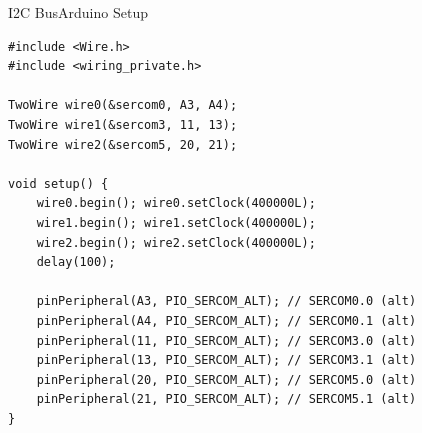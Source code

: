 \begin{frame}
\end{frame}

\begin{frame}[fragile]{I2C Bus}{Arduino Setup}
    \begin{verbatim}
#include <Wire.h>
#include <wiring_private.h>

TwoWire wire0(&sercom0, A3, A4);
TwoWire wire1(&sercom3, 11, 13);
TwoWire wire2(&sercom5, 20, 21);

void setup() {
    wire0.begin(); wire0.setClock(400000L);
    wire1.begin(); wire1.setClock(400000L);
    wire2.begin(); wire2.setClock(400000L);
    delay(100);

    pinPeripheral(A3, PIO_SERCOM_ALT); // SERCOM0.0 (alt)
    pinPeripheral(A4, PIO_SERCOM_ALT); // SERCOM0.1 (alt)
    pinPeripheral(11, PIO_SERCOM_ALT); // SERCOM3.0 (alt)
    pinPeripheral(13, PIO_SERCOM_ALT); // SERCOM3.1 (alt)
    pinPeripheral(20, PIO_SERCOM_ALT); // SERCOM5.0 (alt)
    pinPeripheral(21, PIO_SERCOM_ALT); // SERCOM5.1 (alt)
}
    \end{verbatim}
\end{frame}



